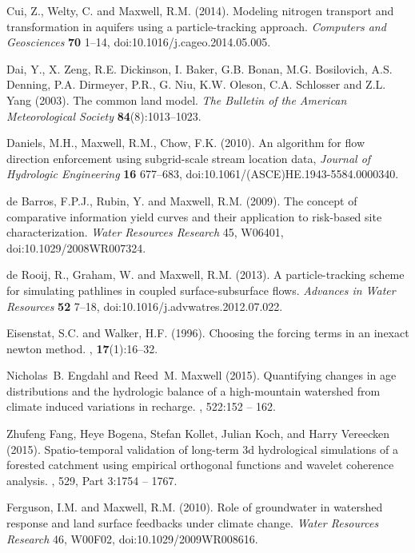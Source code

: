 \begin{thebibliography}{999}
Cui, Z., Welty, C. and Maxwell, R.M. (2014). 
\newblock Modeling nitrogen transport and transformation in aquifers using a particle-tracking approach. {\em Computers and Geosciences} {\bf 70} 1--14, doi:10.1016/j.cageo.2014.05.005.

Dai, Y., X. Zeng, R.E. Dickinson, I. Baker, G.B. Bonan, M.G. Bosilovich, A.S. Denning, P.A. Dirmeyer, P.R., G. Niu, K.W. Oleson, C.A. Schlosser and Z.L. Yang (2003). The common land model. {\em The Bulletin of the American Meteorological Society} {\bf 84}(8):1013--1023.

Daniels, M.H., Maxwell, R.M., Chow, F.K. (2010). An algorithm for flow direction enforcement using subgrid-scale stream location data, {\em Journal of Hydrologic Engineering} {\bf 16} 677--683, doi:10.1061/(ASCE)HE.1943-5584.0000340.

de Barros, F.P.J., Rubin, Y. and Maxwell, R.M. (2009). The concept of comparative information yield curves and their application to risk-based site characterization. {\em Water Resources Research} 45, W06401, doi:10.1029/2008WR007324.

de Rooij, R., Graham, W. and Maxwell, R.M. (2013). A particle-tracking scheme for simulating pathlines in coupled surface-subsurface flows. {\em Advances in Water Resources} {\bf 52} 7--18, doi:10.1016/j.advwatres.2012.07.022.

Eisenstat, S.C. and Walker, H.F. (1996).
\newblock Choosing the forcing terms in an inexact newton method.
, {\bf 17}(1):16--32.

	Nicholas~B. Engdahl and Reed~M. Maxwell (2015).
\newblock Quantifying changes in age distributions and the hydrologic balance
  of a high-mountain watershed from climate induced variations in recharge.
, 522:152 -- 162.

	Zhufeng Fang, Heye Bogena, Stefan Kollet, Julian Koch, and Harry Vereecken (2015).
\newblock Spatio-temporal validation of long-term 3d hydrological simulations
  of a forested catchment using empirical orthogonal functions and wavelet
  coherence analysis.
, 529, Part 3:1754 -- 1767.

Ferguson, I.M. and Maxwell, R.M. (2010). Role of groundwater in watershed response and land surface feedbacks under climate change. {\em Water Resources Research} 46, W00F02, doi:10.1029/2009WR008616.


\end{thebibliography}
